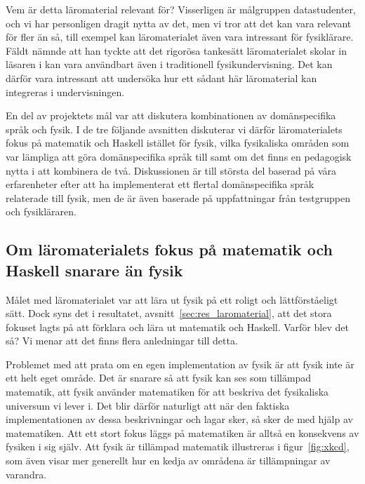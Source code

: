 Vem är detta läromaterial relevant för? Visserligen är målgruppen datastudenter, och vi har personligen dragit nytta av det,
men vi tror att det kan vara relevant för fler än så, till exempel kan läromaterialet även vara intressant för fysiklärare. Fäldt nämnde att han
tyckte att det rigorösa tankesätt läromaterialet skolar in läsaren i kan vara
användbart även i traditionell fysikundervisning. Det kan därför vara intressant att undersöka hur ett sådant här läromaterial kan
integreras i undervisningen.

En del av projektets mål var att diskutera kombinationen av
domänspecifika språk och fysik. I de tre följande avsnitten diskuterar vi därför
läromaterialets fokus på matematik och Haskell istället för fysik, vilka
fysikaliska områden som var lämpliga att göra domänspecifika språk till samt om
det finns en pedagogisk nytta i att kombinera de två. Diskussionen är till
största del baserad på våra erfarenheter efter att ha implementerat ett flertal
domänspecifika språk relaterade till fysik, men de är även baserade på
uppfattningar från testgruppen och fysikläraren.


\subsection{Om läromaterialets fokus på matematik och Haskell snarare än
fysik}\label{sec:fpf}

Målet med läromaterialet var att lära ut fysik på ett roligt och lättförståeligt
sätt. Dock syns det i resultatet, avsnitt~\ref{sec:res_laromaterial}, att det
stora fokuset lagts på att förklara och lära ut matematik och Haskell. Varför
blev det så? Vi menar att det finns flera anledningar till detta.

Problemet med att prata om en egen implementation av fysik är att fysik inte är
ett helt eget område. Det är snarare så att fysik kan ses som tillämpad
matematik, att fysik använder matematiken för att beskriva det fysikaliska
universum vi lever i. Det blir därför naturligt att när den faktiska
implementationen av dessa beskrivningar och lagar sker, så sker de med hjälp av
matematiken. Att ett stort fokus läggs på matematiken är alltså en
konsekvens av fysiken i sig själv. Att fysik är tillämpad matematik illustreras i figur~\ref{fig:xkcd}, som även visar mer generellt hur en kedja av områdena är tillämpningar av varandra.

